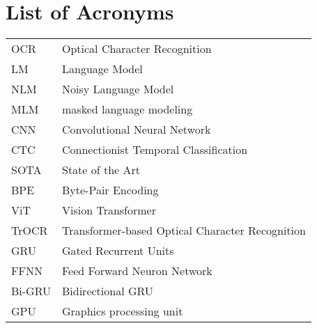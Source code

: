 {}
\chapter*{List of Acronyms}

\begin{supertabular}{lp{12.5cm}}
OCR & Optical Character Recognition\\
LM & Language Model\\
NLM & Noisy Language Model\\
MLM & masked language modeling\\
CNN & Convolutional Neural Network\\
CTC & Connectionist Temporal Classification\\
SOTA & State of the Art\\
BPE & Byte-Pair Encoding\\
ViT & Vision Transformer\\
TrOCR & Transformer-based Optical Character Recognition\\
GRU & Gated Recurrent Units\\
FFNN & Feed Forward Neuron Network\\
Bi-GRU & Bidirectional GRU\\
GPU & Graphics processing unit\\
\end{supertabular}

\newpage